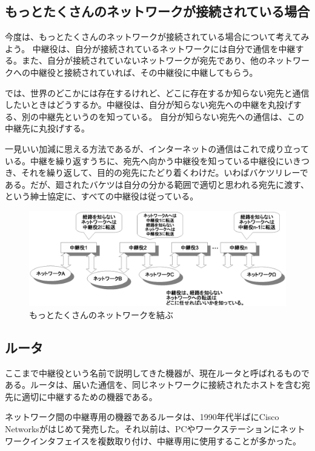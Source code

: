 \subsection{もっとたくさんのネットワークが接続されている場合}

今度は、もっとたくさんのネットワークが接続されている場合について考えてみよう。
中継役は、自分が接続されているネットワークには自分で通信を中継する。また、自分が接続されていないネットワークが宛先であり、他のネットワークへの中継役と接続されていれば、その中継役に中継してもらう。

では、世界のどこかには存在するけれど、どこに存在するか知らない宛先と通信したいときはどうするか。中継役は、自分が知らない宛先への中継を丸投げする、別の中継先というのを知っている。
自分が知らない宛先への通信は、この中継先に丸投げする。

一見いい加減に思える方法であるが、インターネットの通信はこれで成り立っている。中継を繰り返すうちに、宛先へ向かう中継役を知っている中継役にいきつき、それを繰り返して、目的の宛先にたどり着くわけだ。いわばバケツリレーである。だが、廻されたバケツは自分の分かる範囲で適切と思われる宛先に渡す、という紳士協定に、すべての中継役は従っている。

\begin{figure}[htbp]
	\includegraphics[width=12cm,clip]{draw/ip_basic4.eps}
	\caption{もっとたくさんのネットワークを結ぶ}
	\label{fig:ip_basic4}
\end{figure}

\subsection{ルータ}
ここまで中継役という名前で説明してきた機器が、現在ルータと呼ばれるものである。ルータは、届いた通信を、同じネットワークに接続されたホストを含む宛先に適切に中継するための機器である。

ネットワーク間の中継専用の機器であるルータは、1990年代半ばにCisco Networksがはじめて発売した。それ以前は、PCやワークステーションにネットワークインタフェイスを複数取り付け、中継専用に使用することが多かった。

